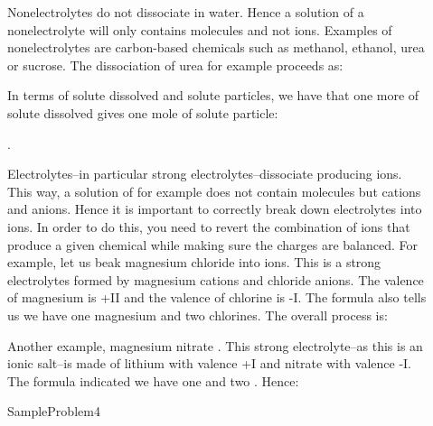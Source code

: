 \documentclass[main.tex]{subfiles}
\begin{document}
\begin{description}
\item[] Nonelectrolytes do not dissociate in water. Hence a solution of a nonelectrolyte will only contains molecules and not ions. Examples of nonelectrolytes are carbon-based chemicals such as methanol, ethanol, urea or sucrose. The dissociation of urea for example  proceeds as:
\begin{center}\end{center}
In terms of solute dissolved and solute particles, we have that one more of solute dissolved gives one mole of solute particle:
\begin{center}.\end{center}
\item[] Electrolytes--in particular strong electrolytes--dissociate producing ions. This way, a solution of for example  does not contain  molecules but  cations and  anions. Hence it is important to  correctly break down electrolytes into ions. In order to do this, you need to revert the combination of ions that produce a given chemical while making sure the charges are balanced. For example, let us beak magnesium chloride  into ions. This is a strong electrolytes formed by magnesium cations and chloride anions. The valence of magnesium is +II and the valence of chlorine is -I. The  formula also tells us we have one magnesium and two chlorines. The overall process is:
\begin{center}\end{center}
Another example, magnesium nitrate . This strong electrolyte--as this is an ionic salt--is made of lithium with valence +I and nitrate with valence -I. The formula indicated we have one  and two . Hence:
\begin{center}\end{center}

{SampleProblem4}





\end{description}
\end{document}
